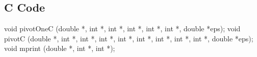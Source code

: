 \documentclass[12pt,]{article}
\newenvironment{Shaded}{\begin{snugshade}}{\end{snugshade}}
\newcommand{\DataTypeTok}[1]{\textcolor[rgb]{0.13,0.29,0.53}{#1}}
\newcommand{\NormalTok}[1]{#1}
\begin{document}
\subsection{C Code}\label{c-code}

\begin{Shaded}
\begin{Highlighting}[]
\DataTypeTok{void}\NormalTok{ pivotOneC (}\DataTypeTok{double}\NormalTok{ *, }\DataTypeTok{int}\NormalTok{ *, }\DataTypeTok{int}\NormalTok{ *, }\DataTypeTok{int}\NormalTok{ *, }\DataTypeTok{int}\NormalTok{ *, }\DataTypeTok{int}\NormalTok{ *, }\DataTypeTok{double}\NormalTok{ *eps);}
\DataTypeTok{void}\NormalTok{ pivotC (}\DataTypeTok{double}\NormalTok{ *, }\DataTypeTok{int}\NormalTok{ *, }\DataTypeTok{int}\NormalTok{ *, }\DataTypeTok{int}\NormalTok{ *, }\DataTypeTok{int}\NormalTok{ *, }\DataTypeTok{int}\NormalTok{ *, }\DataTypeTok{int}\NormalTok{ *, }\DataTypeTok{int}\NormalTok{ *, }\DataTypeTok{int}\NormalTok{ *, }\DataTypeTok{double}\NormalTok{ *eps);}
\DataTypeTok{void}\NormalTok{ mprint (}\DataTypeTok{double}\NormalTok{ *, }\DataTypeTok{int}\NormalTok{ *, }\DataTypeTok{int}\NormalTok{ *);}


\end{Highlighting}
\end{Shaded}
\end{document}
